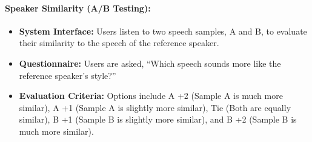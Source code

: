 \documentclass[11pt]{article}
\begin{document}
    \paragraph{Speaker Similarity (A/B Testing):}

    \begin{itemize}[itemsep=0ex,leftmargin=2ex]
        \item \textbf{System Interface:} Users listen to two speech samples, A and B, to evaluate their similarity to the speech of the reference speaker.
        
        \item \textbf{Questionnaire:} Users are asked, ``Which speech sounds more like the reference speaker's style?''
        
        \item \textbf{Evaluation Criteria:} Options include A +2 (Sample A is much more similar), A +1 (Sample A is slightly more similar), Tie (Both are equally similar), B +1 (Sample B is slightly more similar), and B +2 (Sample B is much more similar).
    \end{itemize}
\end{document}
